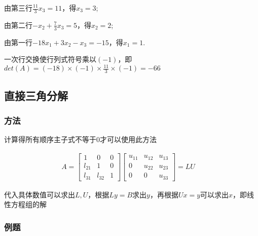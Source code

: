 由第三行$\frac{11}{3}x_3=11$，得$x_3=3$;

由第二行$-x_2+\frac{7}{3}x_3=5$，得$x_2=2$;

由第一行$-18x_1+3x_2-x_3=-15$，得$x_1=1$.

一次行交换使行列式符号乘以$(-1)$，即$det(A)=(-18)\times(-1)\times\frac{11}{3}\times(-1)=-66$


\subsection{直接三角分解}

\subsubsection{方法}

计算得所有顺序主子式不等于0才可以使用此方法

\[
\begin{aligned}
    A=
    \left[
    \begin{array}{ccc}
        1 & 0 & 0 \\
        l_{21} & 1 & 0 \\
        l_{31} & l_{32} & 1
    \end{array}
    \right]
    \left[
    \begin{array}{ccc}
        u_{11} & u_{12} & u_{13} \\
        0 & u_{22} & u_{23} \\
        0 & 0 & u_{33}
    \end{array}
    \right]
    =LU
    \quad
\end{aligned}
\]

代入具体数值可以求出$L,U$，根据$Ly=B$求出$y$，再根据$Ux=y$可以求出$x$，即线性方程组的解

\subsubsection{例题}

